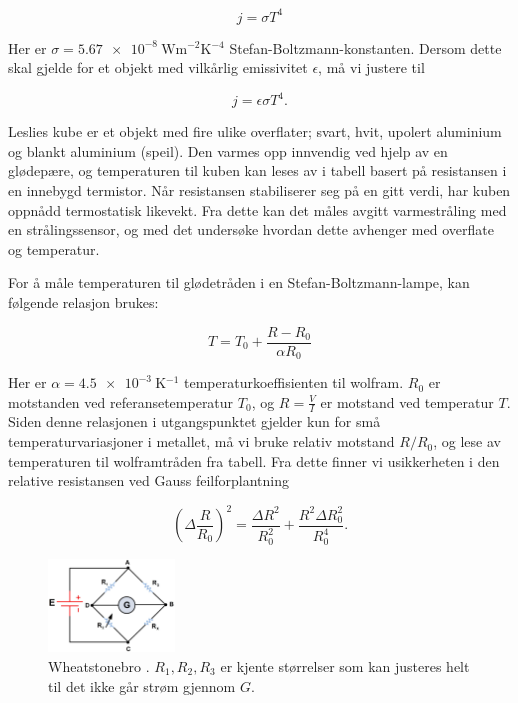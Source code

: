 \begin{equation}
  j = \sigma T^4
\label{eq:SB} %
\end{equation}

Her er $\sigma = \SI{5,67e-8}{\watt\metre^{-2}\kelvin^{-4}}$ Stefan-Boltzmann-konstanten. Dersom dette skal gjelde for et objekt med vilkårlig emissivitet $\epsilon$, må vi justere til

\begin{equation}
  j = \epsilon\sigma T^4.
\label{eq:SBepsilon} %
\end{equation}

Leslies kube er et objekt med fire ulike overflater; svart, hvit, upolert aluminium og blankt aluminium (speil). Den varmes opp innvendig ved hjelp av en glødepære, og temperaturen til kuben kan leses av i tabell basert på resistansen i en innebygd termistor. Når resistansen stabiliserer seg på en gitt verdi, har kuben oppnådd termostatisk likevekt. Fra dette kan det måles avgitt varmestråling med en strålingssensor, og med det undersøke hvordan dette avhenger med overflate og temperatur.

For å måle temperaturen til glødetråden i en Stefan-Boltzmann-lampe, kan følgende relasjon brukes:

\begin{equation}
  T=T_0+\frac{R-R_0}{\alpha R_0}
\label{eq:TempMetall} 
\end{equation}

Her er $\alpha=\SI{4,5e-3}{\kelvin^{-1}}$ temperaturkoeffisienten til wolfram. $R_0$ er motstanden ved referansetemperatur $T_0$, og $R=\frac{V}{I}$ er motstand ved temperatur $T$. Siden denne relasjonen i utgangspunktet gjelder kun for små temperaturvariasjoner i metallet, må vi bruke relativ motstand $R/R_0$, og lese av temperaturen til wolframtråden fra tabell. Fra dette finner vi usikkerheten i den relative resistansen ved Gauss feilforplantning

\begin{equation}
  \label{eq:ErrorRelRes}
  \left( \Delta \frac{R}{R_{0}} \right) ^{2} = \frac{\Delta R^{2}}{R_{0}^{2}} + \frac{R^{2} \Delta R_{0}^{2}}{R_{0}^{4}}.
\end{equation}


\begin{figure}
  \centering
  \includegraphics[width=0.30\textwidth]{wheat.jpg}
  \caption{Wheatstonebro \cite{wheatstone}. $R_{1}, R_{2}, R_{3}$ er kjente størrelser som kan justeres helt til det ikke går strøm gjennom $G$.}
  \label{fig:Wheatstone}
\end{figure}

